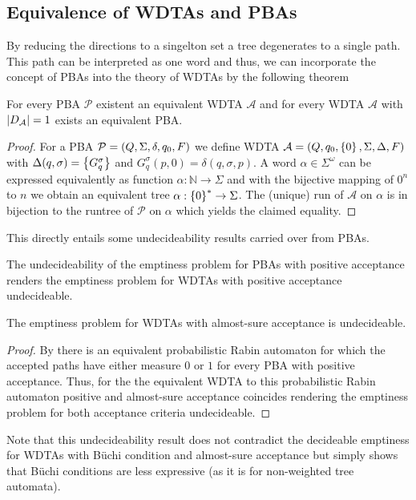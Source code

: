 \subsection{Equivalence of \acp*{WDTA} and \acp*{PBA}}
By reducing the directions to a singelton set a tree degenerates to a single
path. This path can be interpreted as one word and thus, we can incorporate the
concept of \acp{PBA} into the theory of \acp{WDTA} by the following theorem
\begin{theorem}
  For every \ac{PBA} $\mathcal{P}$ existent an equivalent \ac{WDTA}
  $\mathcal{A}$ and for every \ac{WDTA} $\mathcal{A}$ with
  $\left\vert{D_{\mathcal{A}}}\right\vert = 1$ exists an equivalent \ac{PBA}.
  \label{theorem:pbaequiv}
\end{theorem}
\begin{proof}
  For a \ac{PBA} $\mathcal{P} = \left(Q, \Sigma, \delta, q_{0}, F\right)$ we define
  \ac{WDTA} $\mathcal{A} = \left(Q, q_{0}, \left\{0\right\}, \Sigma, \Delta, F\right)$ with
  $\Delta(q,\sigma) = \left\{G_{q}^{\sigma}\right\}$ and
  $G_{q}^{\sigma}(p, 0) = \delta(q, \sigma, p)$. A word
  $\alpha\in\Sigma^{\omega}$ can be expressed equivalently as function
  $\alpha:\mathbb{N}\rightarrow\Sigma$ and with the bijective mapping of $0^n$
  to $n$ we obtain an equivalent tree $\alpha:\left\{0\right\}^{*}\rightarrow\Sigma$.
  The (unique) run of $\mathcal{A}$ on $\alpha$ is in bijection to the runtree
  of $\mathcal{P}$ on $\alpha$ which yields the claimed equality.
\end{proof}
This directly entails some undecideability results carried over from \acp{PBA}.
\begin{corollary}
  The undecideability of the emptiness problem for \acp{PBA} with positive
  acceptance \cite{Groesser} renders the emptiness problem for \acp{WDTA} with
  positive acceptance undecideable.
\end{corollary}
\begin{corollary}
  The emptiness problem for \acp{WDTA} with almost-sure acceptance is
  undecideable.
\end{corollary}
\begin{proof}
  By \cite[Proof of Theorem 1]{DecProblemsForProbAuto} there is an equivalent
  probabilistic Rabin automaton for which the accepted paths have either
  measure $0$ or $1$ for every \ac{PBA} with positive acceptance. Thus, for the
  the equivalent \ac{WDTA} to this probabilistic Rabin automaton positive and
  almost-sure acceptance coincides rendering the emptiness problem for both
  acceptance criteria undecideable.
\end{proof}
Note that this undecideability result does not contradict the decideable
emptiness for \acp{WDTA} with Büchi condition and almost-sure acceptance but
simply shows that Büchi conditions are less expressive (as it is for
non-weighted tree automata).

